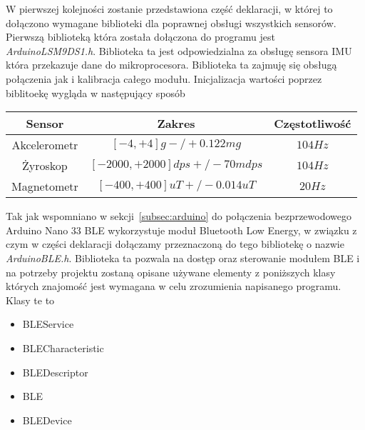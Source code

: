 W pierwszej kolejności zostanie przedstawiona część deklaracji, w której to dołączono wymagane biblioteki dla poprawnej obsługi wszystkich sensorów. Pierwszą biblioteką która została dołączona do programu jest \textit{Arduino\textunderscore LSM9DS1.h}. Biblioteka ta jest odpowiedzialna za obsługę sensora IMU która przekazuje dane do mikroprocesora. Biblioteka ta zajmuję się obsługą połączenia jak i kalibracja całego modułu. Inicjalizacja wartości poprzez biblitoekę wygląda w następujący sposób~\cite{ArduinoIMU}
\begin{center}
\begin{tabular}{|c|c|c|}
\hline
Sensor & Zakres & Częstotliwość \\ \hline
Akcelerometr & $[-4,+4]g -/+0.122 mg$ & $104 Hz$\\ \hline
Żyroskop & $[-2000, +2000] dps +/-70 mdps$ & $104 Hz$\\ \hline
Magnetometr & $[-400, +400] uT +/-0.014 uT$ & $20 Hz$ \\ \hline
\hline
\end{tabular}
\end{center}
Tak jak wspomniano w sekcji~\ref{subsec:arduino} do połączenia bezprzewodowego Arduino Nano 33 BLE wykorzystuje moduł Bluetooth Low Energy, w związku z czym w części deklaracji dołączamy przeznaczoną do tego bibliotekę o nazwie \textit{ArduinoBLE.h}. Biblioteka ta pozwala na dostęp oraz sterowanie modułem BLE i na potrzeby projektu zostaną opisane używane elementy z poniższych klasy których znajomość jest wymagana w celu zrozumienia napisanego programu. Klasy te to
\begin{itemize}
\item BLEService
\item BLECharacteristic
\item BLEDescriptor
\item BLE
\item BLEDevice
\end{itemize}
